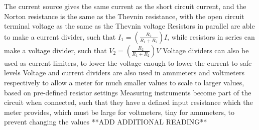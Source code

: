 \documentclass[11 pt, twoside]{article}
\newenvironment{outline*}
{
	\begin{outline}[enumerate]
	}
	{\end{outline}
}
\begin{document}
\begin{outline*}
		\3 The current source gives the same current as the short circuit current, and the Norton resistance is the same as the Thevnin resistance, with the open circuit terminal voltage as the same as the Thevnin voltage
\1 Resistors in parallel are able to make a current divider, such that $I_1 = (\frac{R_2}{R_1 + R_2})I$, while resistors in series can make a voltage divider, such that $V_2 = (\frac{R_2}{R_1 + R_2})V$
	\2 Voltage dividers can also be used as current limiters, to lower the voltage enough to lower the current to safe levels
	\2 Voltage and current dividers are also used in amnmeters and voltmeters respectively to allow a meter for much smaller values to scale to larger values, based on pre-defined resistor settings
\1 Measuring instruments become part of the circuit when connected, such that they have a defined input resistance which the meter provides, which must be large for voltmeters, tiny for amnmeters, to prevent changing the values
\1 **ADD ADDITIONAL READING**
\end{outline*}
\end{document}

